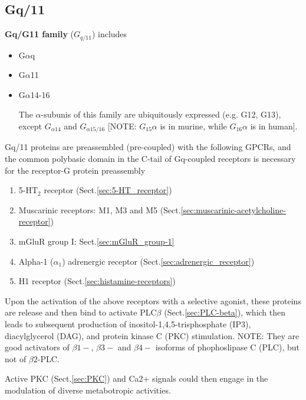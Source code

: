 \subsection{Gq/11}
\label{sec:Gq/11-protein}

{\bf Gq/G11 family} ($G_{q/11}$) includes 
\begin{itemize}
  \item G$\alpha$q
  
  \item G$\alpha$11
  
  \item G$\alpha$14-16

The $\alpha$-subunis of this family are ubiquitously expressed (e.g. G12, G13),
except $G_{\alpha14}$ and $G_{\alpha15/16}$ 
[NOTE: $G_{15}\alpha$ is in murine, while
$G_{16}\alpha$ is in human].

\end{itemize}

Gq/11 proteins are preassembled (pre-coupled) with the following GPCRs,
and the common polybasic domain in the C-tail of Gq-coupled receptors is
necessary for the receptor-G protein preassembly \citep{qin2011}
\begin{enumerate}
  \item 5-HT$_2$ receptor (Sect.\ref{sec:5-HT_receptor})
  
  \item Muscarinic receptors: M1, M3 and M5 (Sect.\ref{sec:muscarinic-acetylcholine-receptor})
  
  \item mGluR group I: Sect.\ref{sec:mGluR_group-1}
  
  \item Alpha-1 ($\alpha_1$) adrenergic receptor (Sect.\ref{sec:adrenergic_receptor})
  
  \item H1 receptor (Sect.\ref{sec:histamine-receptors})
\end{enumerate}

Upon the activation of the above receptors with a selective agonist, these
proteins are release and then bind to activate PLC$\beta$
(Sect.\ref{sec:PLC-beta}), which then leads to subsequent production of
inositol-1,4,5-trisphosphate (IP3), diacylglycerol (DAG), and protein kinase C
(PKC) stimulation. NOTE: They are good activators of $\beta1-$, $\beta3-$ and
$\beta4-$ isoforms of phophoslipase C (PLC), but not of $\beta2$-PLC.


Active PKC (Sect.\ref{sec:PKC}) and Ca2+ signals could then engage in the
modulation of diverse metabotropic activities.




